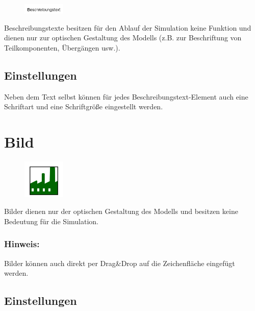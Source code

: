 \begin{figure}
\vspace{-22pt}
\includegraphics[width=2cm]{imageModelElementText.png}
\vspace{-22pt}
\end{figure}

Beschreibungstexte besitzen für den Ablauf der Simulation keine Funktion und dienen nur zur optischen Gestaltung des Modells
(z.B. zur Beschriftung von Teilkomponenten, Übergängen usw.).

\subsection*{Einstellungen}

Neben dem Text selbst können für jedes Beschreibungstext-Element auch eine Schriftart und eine Schriftgröße eingestellt werden.


\section{Bild}
\label{ref:ModelElementImage}

\begin{figure}
\vspace{-22pt}
\includegraphics[width=2cm]{imageModelElementImage.png}
\vspace{-22pt}
\end{figure}

Bilder dienen nur der optischen Gestaltung des Modells und besitzen keine Bedeutung für die Simulation.

\subsubsection*{Hinweis:}

Bilder können auch direkt per Drag\&Drop auf die Zeichenfläche eingefügt werden.

\subsection*{Einstellungen}

